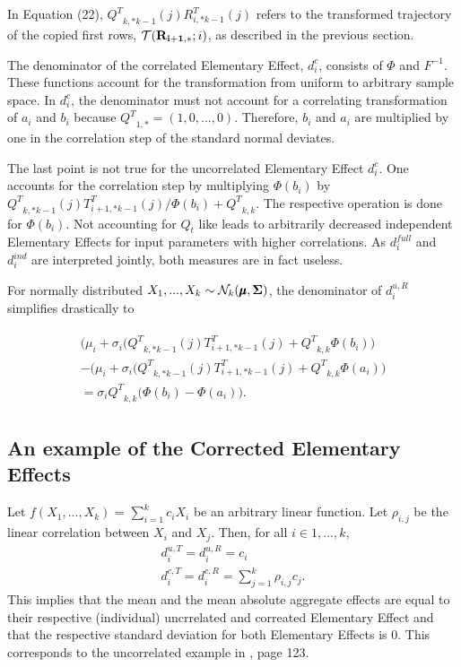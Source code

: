 \documentclass[a4paper,12pt]{article}
\begin{document}
\noindent
In Equation (22), ${Q^T}_{k,*k-1}(j)R_{i,*k-1}^T(j)$ refers to the transformed trajectory of the copied first rows, $\mathcal{T}(\bold{R_{i+1,*}}; i)$, as described in the previous section.

The denominator of the correlated Elementary Effect, $d_i^{c}$, consists of $\Phi$ and $F^{-1}$. These functions account for the transformation from uniform to arbitrary sample space. In $d_i^{c}$, the denominator must not account for a correlating transformation of $a_i$ and $b_i$ because ${Q^T}_{1,*} = (1, 0, ..., 0)$.  Therefore, $b_i$ and $a_i$ are multiplied by one in the correlation step of the standard normal deviates.

The last point is not true for the uncorrelated Elementary Effect $d_i^{c}$. One accounts for the correlation step by multiplying $\Phi(b_i)$ by ${Q^T}_{k,*k-1}(j)T_{i+1,*k-1}^T(j)/\Phi(b_i)+{Q^T}_{k,k}$. The respective operation is done for $\Phi(b_i)$. Not accounting for $Q_t$ like \cite{ge2017extending} leads to arbitrarily decreased independent Elementary Effects for input parameters with higher correlations. As $d_i^{full}$ and $d_i^{ind}$ are interpreted jointly, both measures are in fact useless.

For normally distributed $X_1, ..., X_k \sim \mathcal{N}_k(\pmb{\mu}, \bold{\Sigma})$, the denominator of $d_i^{u, R}$ simplifies drastically to

\begin{align}
\begin{split}
 \big(\mu_i + \sigma_i\big({Q^T}_{k,*k-1}(j)T_{i+1,*k-1}^T(j) + {Q^T}_{k,k} \Phi(b_i)\big) \\-  \big(\mu_i + \sigma_i\big({Q^T}_{k,*k-1}(j)T_{i+1,*k-1}^T(j) + {Q^T}_{k,k} \Phi(a_i)\big)\\= \sigma_i{Q^T}_{k,k}\big(\Phi(b_i)-\Phi(a_i)\big).
 \end{split}
\end{align}

\subsection{An example of the Corrected Elementary Effects}

Let $f(X_1, ..., X_k)$ = $\sum_{i = 1}^{k} c_i X_i$ be an arbitrary linear function. Let $\rho_{i,j}$ be the linear correlation between $X_i$ and $X_j$. Then, for all $i \in 1, ..., k$,
\begin{align}
d_i^{u,T} = d_i^{u,R} = c_i \\
d_i^{c,T} = d_i^{c,R} = \sum_{j = 1}^{k} \rho_{i,j} c_{j}.
\end{align}
This implies that the mean and the mean absolute aggregate effects are equal to their respective (individual) uncrrelated and correated Elementary Effect and that the respective standard deviation for both Elementary Effects is 0. This corresponds to the uncorrelated example in \cite{Saltelli.2008}, page 123.







\newpage

\end{document}
